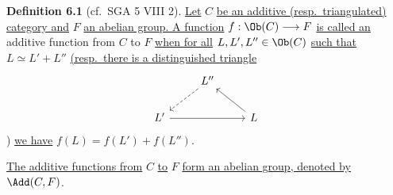 \textbf{Definition 6.1} (cf.\ SGA 5 VIII 2). \uline{Let} \(C\) \uline{be an additive (resp.\ triangulated) category and} \(F\) \uline{an abelian group. A function} \(f:\Ob(C)\longrightarrow F\) \uline{is called an} additive function from \(C\) to \(F\) \uline{when for all} \(L,L',L''\in\Ob(C)\) \uline{such that} \(L\simeq L'+L''\) \uline{(resp.\ there is a distinguished triangle}
\[
\begin{tikzcd}
& L'' \arrow[dl, dashed] & \\
L' \arrow[rr] && L \arrow[ul]
\end{tikzcd}
\]
) \uline{we have} \(f(L)=f(L')+f(L'')\).

\uline{The additive functions from} \(C\) \uline{to} \(F\) \uline{form an abelian group, denoted by} \(\Add(C,F)\).

